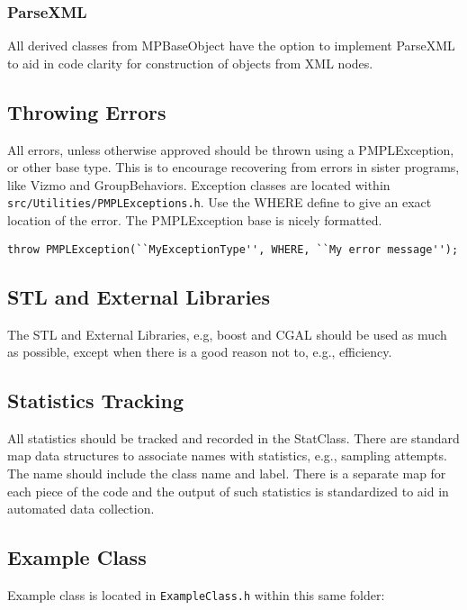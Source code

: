 \documentclass[12pt]{article}
\begin{document}
\subsubsection{ParseXML}

All derived classes from MPBaseObject have the option to implement ParseXML to
aid in code clarity for construction of objects from XML nodes.

\subsection{Throwing Errors}

All errors, unless otherwise approved should be thrown using a PMPLException, or
other base type. This is to encourage recovering from errors in sister programs,
like Vizmo and GroupBehaviors. Exception classes are located within
\texttt{src/Utilities/PMPLExceptions.h}. Use the WHERE define to give an exact
location of the error. The PMPLException base is nicely formatted.

\begin{lstlisting}
throw PMPLException(``MyExceptionType'', WHERE, ``My error message'');
\end{lstlisting}

\subsection{STL and External Libraries}

The STL and External Libraries, e.g, boost and CGAL should be used as much as
possible, except when there is a good reason not to, e.g., efficiency.

\subsection{Statistics Tracking}

All statistics should be tracked and recorded in the StatClass. There are
standard map data structures to associate names with statistics, e.g., sampling
attempts. The name should include the class name and label. There is a separate
map for each piece of the code and the output of such statistics is standardized
to aid in automated data collection.

\subsection{Example Class}
Example class is located in \texttt{ExampleClass.h} within this same folder:
\end{document}
